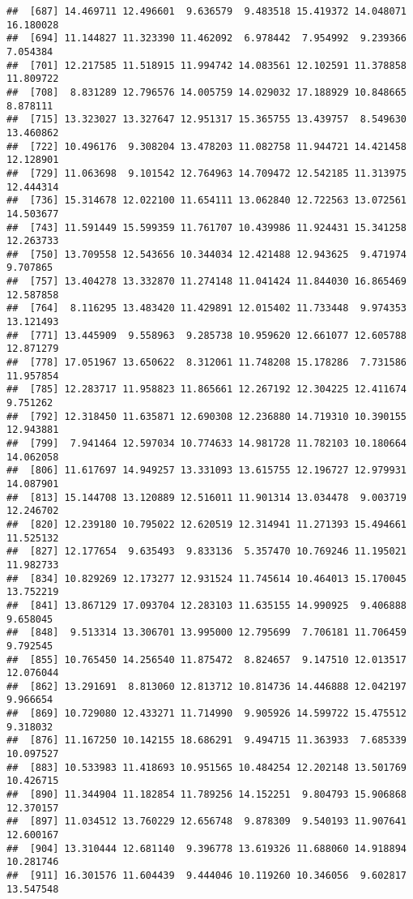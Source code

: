 \documentclass[
]{article}
\begin{document}
\begin{verbatim}
##  [687] 14.469711 12.496601  9.636579  9.483518 15.419372 14.048071 16.180028
##  [694] 11.144827 11.323390 11.462092  6.978442  7.954992  9.239366  7.054384
##  [701] 12.217585 11.518915 11.994742 14.083561 12.102591 11.378858 11.809722
##  [708]  8.831289 12.796576 14.005759 14.029032 17.188929 10.848665  8.878111
##  [715] 13.323027 13.327647 12.951317 15.365755 13.439757  8.549630 13.460862
##  [722] 10.496176  9.308204 13.478203 11.082758 11.944721 14.421458 12.128901
##  [729] 11.063698  9.101542 12.764963 14.709472 12.542185 11.313975 12.444314
##  [736] 15.314678 12.022100 11.654111 13.062840 12.722563 13.072561 14.503677
##  [743] 11.591449 15.599359 11.761707 10.439986 11.924431 15.341258 12.263733
##  [750] 13.709558 12.543656 10.344034 12.421488 12.943625  9.471974  9.707865
##  [757] 13.404278 13.332870 11.274148 11.041424 11.844030 16.865469 12.587858
##  [764]  8.116295 13.483420 11.429891 12.015402 11.733448  9.974353 13.121493
##  [771] 13.445909  9.558963  9.285738 10.959620 12.661077 12.605788 12.871279
##  [778] 17.051967 13.650622  8.312061 11.748208 15.178286  7.731586 11.957854
##  [785] 12.283717 11.958823 11.865661 12.267192 12.304225 12.411674  9.751262
##  [792] 12.318450 11.635871 12.690308 12.236880 14.719310 10.390155 12.943881
##  [799]  7.941464 12.597034 10.774633 14.981728 11.782103 10.180664 14.062058
##  [806] 11.617697 14.949257 13.331093 13.615755 12.196727 12.979931 14.087901
##  [813] 15.144708 13.120889 12.516011 11.901314 13.034478  9.003719 12.246702
##  [820] 12.239180 10.795022 12.620519 12.314941 11.271393 15.494661 11.525132
##  [827] 12.177654  9.635493  9.833136  5.357470 10.769246 11.195021 11.982733
##  [834] 10.829269 12.173277 12.931524 11.745614 10.464013 15.170045 13.752219
##  [841] 13.867129 17.093704 12.283103 11.635155 14.990925  9.406888  9.658045
##  [848]  9.513314 13.306701 13.995000 12.795699  7.706181 11.706459  9.792545
##  [855] 10.765450 14.256540 11.875472  8.824657  9.147510 12.013517 12.076044
##  [862] 13.291691  8.813060 12.813712 10.814736 14.446888 12.042197  9.966654
##  [869] 10.729080 12.433271 11.714990  9.905926 14.599722 15.475512  9.318032
##  [876] 11.167250 10.142155 18.686291  9.494715 11.363933  7.685339 10.097527
##  [883] 10.533983 11.418693 10.951565 10.484254 12.202148 13.501769 10.426715
##  [890] 11.344904 11.182854 11.789256 14.152251  9.804793 15.906868 12.370157
##  [897] 11.034512 13.760229 12.656748  9.878309  9.540193 11.907641 12.600167
##  [904] 13.310444 12.681140  9.396778 13.619326 11.688060 14.918894 10.281746
##  [911] 16.301576 11.604439  9.444046 10.119260 10.346056  9.602817 13.547548

\end{verbatim}
\end{document}
